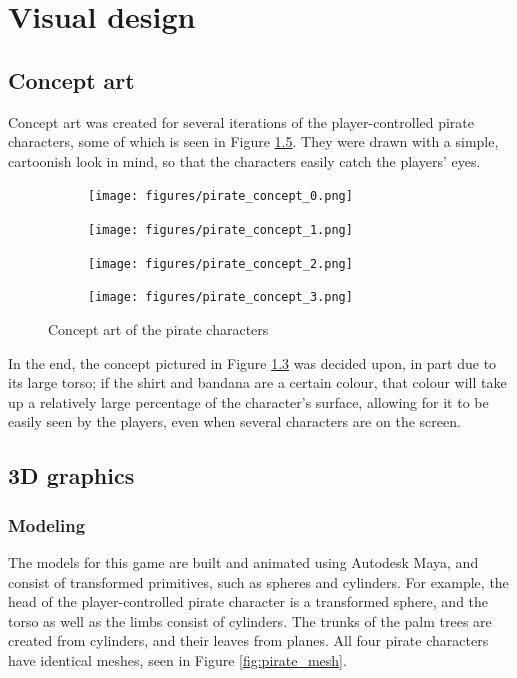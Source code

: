 \chapter{Visual design}\label{ch:visualDesign}
\section{Concept art}
Concept art was created for several iterations of the player-controlled pirate characters, some of which is seen in Figure \ref{fig:pirate_concepts}. They were drawn with a simple, cartoonish look in mind, so that the characters easily catch the players' eyes. 

\begin{figure}[h!]
    \centering
    \begin{subfigure}[b]{0.2\textwidth}
		\centering        
        \texttt{[image: figures/pirate\_concept\_0.png]}\caption{ \label{fig:pirate_concept_0}}
    \end{subfigure}
    \begin{subfigure}[b]{0.2\textwidth}
    	\centering
        \texttt{[image: figures/pirate\_concept\_1.png]}\caption{ \label{fig:pirate_concept_1}}
    \end{subfigure}
    \begin{subfigure}[b]{0.2\textwidth}
    	\centering
        \texttt{[image: figures/pirate\_concept\_2.png]}\caption{ \label{fig:pirate_concept_2}}
    \end{subfigure}
    \begin{subfigure}[b]{0.2\textwidth}
    	\centering
        \texttt{[image: figures/pirate\_concept\_3.png]}\caption{ \label{fig:pirate_concept_3}}
    \end{subfigure}
    \caption{Concept art of the pirate characters}\label{fig:pirate_concepts}
\end{figure}

In the end, the concept pictured in Figure \ref{fig:pirate_concept_2} was decided upon, in part due to its large torso; if the shirt and bandana are a certain colour, that colour will take up a relatively large percentage of the character's surface, allowing for it to be easily seen by the players, even when several characters are on the screen. 

\section{3D graphics}

\subsection{Modeling}
The models for this game are built and animated using Autodesk Maya, and consist of transformed primitives, such as spheres and cylinders. For example, the head of the player-controlled pirate character is a transformed sphere, and the torso as well as the limbs consist of cylinders. The trunks of the palm trees are created from cylinders, and their leaves from planes. All four pirate characters have identical meshes, seen in Figure \ref{fig:pirate_mesh}.

